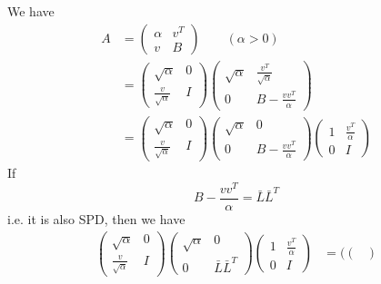 \begin{theorem}
    We have \begin{align*}
        A &= \begin{pmatrix}
            \alpha & v^T \\
            v & B
        \end{pmatrix} \qquad (\alpha > 0) \\[3pt]
        &= \begin{pmatrix}
            \sqrt{\alpha} & 0 \\
            \frac{v}{\sqrt{\alpha}} & I
        \end{pmatrix} \begin{pmatrix}
            \sqrt{\alpha} & \frac{v^T}{\sqrt{\alpha}} \\
            0 & B - \frac{vv^T}{\alpha}
        \end{pmatrix} \\[3pt]
        &= \begin{pmatrix}
            \sqrt{\alpha} & 0 \\
            \frac{v}{\sqrt{\alpha}} & I
        \end{pmatrix} \begin{pmatrix}
            \sqrt{\alpha} & 0 \\
            0 & B - \frac{vv^T}{\alpha}
        \end{pmatrix} \begin{pmatrix}
            1 & \frac{v^T}{\alpha} \\
            0 & I
        \end{pmatrix}
    \end{align*}
    If \[
        B - \frac{vv^T}{\alpha} = \bar{L} \bar{L}^T
    \]
    i.e. it is also SPD, then we have \begin{align*}
        \begin{pmatrix}
            \sqrt{\alpha} & 0 \\
            \frac{v}{\sqrt{\alpha}} & I
        \end{pmatrix} \begin{pmatrix}
            \sqrt{\alpha} & 0 \\
            0 & \bar{L} \bar{L}^T
        \end{pmatrix} \begin{pmatrix}
            1 & \frac{v^T}{\alpha} \\
            0 & I
        \end{pmatrix} &= (\begin{pmatrix}

\end{pmatrix}
\end{align*}
\end{theorem}
